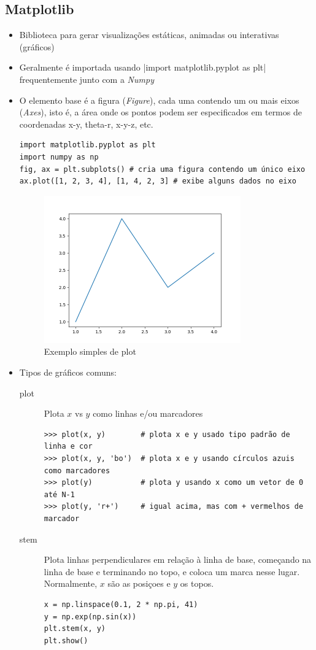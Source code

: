 \subsection{Matplotlib}
\begin{itemize}
	\item Biblioteca para gerar visualizações estáticas, animadas ou interativas (gráficos)~\cite{hunter_matplotlib_2007}
	\item Geralmente é importada usando |import matplotlib.pyplot as plt| frequentemente junto com a \textit{Numpy}
	\item O elemento base é a figura (\textit{Figure}), cada uma contendo um ou mais eixos (\textit{Axes}), isto é, a área onde os pontos podem ser especificados em termos de coordenadas x-y, theta-r, x-y-z, etc.
	\begin{verbatim}
import matplotlib.pyplot as plt
import numpy as np
fig, ax = plt.subplots() # cria uma figura contendo um único eixo
ax.plot([1, 2, 3, 4], [1, 4, 2, 3] # exibe alguns dados no eixo
	\end{verbatim}
	
	\begin{figure}[htb!]
		\centering
		\caption{Exemplo simples de plot}
		\label{fig:plot}
		\includegraphics[width=0.8\textwidth]{figs/plot.png}
	\end{figure}
	
	\item Tipos de gráficos comuns:
	\begin{description}
		\item[plot] Plota $x$ vs $y$ como linhas e/ou marcadores
		\begin{verbatim}
>>> plot(x, y)        # plota x e y usado tipo padrão de linha e cor
>>> plot(x, y, 'bo')  # plota x e y usando círculos azuis como marcadores
>>> plot(y)           # plota y usando x como um vetor de 0 até N-1
>>> plot(y, 'r+')     # igual acima, mas com + vermelhos de marcador
		\end{verbatim}
		\item[stem] Plota linhas perpendiculares em relação à linha de base, começando na linha de base e terminando no topo, e coloca um marca nesse lugar. Normalmente, $x$ são as posiçoes e $y$ os topos.
		\begin{verbatim}
x = np.linspace(0.1, 2 * np.pi, 41)
y = np.exp(np.sin(x))
plt.stem(x, y)
plt.show()
		\end{verbatim}
		

\end{description}
\end{itemize}
